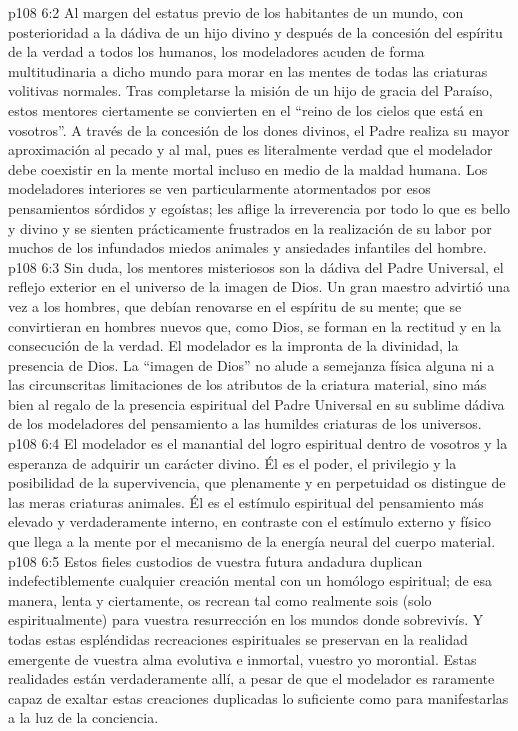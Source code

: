 \vs p108 6:2 Al margen del estatus previo de los habitantes de un mundo, con posterioridad a la dádiva de un hijo divino y después de la concesión del espíritu de la verdad a todos los humanos, los modeladores acuden de forma multitudinaria a dicho mundo para morar en las mentes de todas las criaturas volitivas normales. Tras completarse la misión de un hijo de gracia del Paraíso, estos mentores ciertamente se convierten en el “reino de los cielos que está en vosotros”. A través de la concesión de los dones divinos, el Padre realiza su mayor aproximación al pecado y al mal, pues es literalmente verdad que el modelador debe coexistir en la mente mortal incluso en medio de la maldad humana. Los modeladores interiores se ven particularmente atormentados por esos pensamientos sórdidos y egoístas; les aflige la irreverencia por todo lo que es bello y divino y se sienten prácticamente frustrados en la realización de su labor por muchos de los infundados miedos animales y ansiedades infantiles del hombre.
\vs p108 6:3 \pc Sin duda, los mentores misteriosos son la dádiva del Padre Universal, el reflejo exterior en el universo de la imagen de Dios. Un gran maestro advirtió una vez a los hombres, que debían renovarse en el espíritu de su mente; que se convirtieran en hombres nuevos que, como Dios, se forman en la rectitud y en la consecución de la verdad. El modelador es la impronta de la divinidad, la presencia de Dios. La “imagen de Dios” no alude a semejanza física alguna ni a las circunscritas limitaciones de los atributos de la criatura material, sino más bien al regalo de la presencia espiritual del Padre Universal en su sublime dádiva de los modeladores del pensamiento a las humildes criaturas de los universos.
\vs p108 6:4 El modelador es el manantial del logro espiritual dentro de vosotros y la esperanza de adquirir un carácter divino. Él es el poder, el privilegio y la posibilidad de la supervivencia, que plenamente y en perpetuidad os distingue de las meras criaturas animales. Él es el estímulo espiritual del pensamiento más elevado y verdaderamente interno, en contraste con el estímulo externo y físico que llega a la mente por el mecanismo de la energía neural del cuerpo material.
\vs p108 6:5 Estos fieles custodios de vuestra futura andadura duplican indefectiblemente cualquier creación mental con un homólogo espiritual; de esa manera, lenta y ciertamente, os recrean tal como realmente sois (solo espiritualmente) para vuestra resurrección en los mundos donde sobrevivís. Y todas estas espléndidas recreaciones espirituales se preservan en la realidad emergente de vuestra alma evolutiva e inmortal, vuestro yo morontial. Estas realidades están verdaderamente allí, a pesar de que el modelador es raramente capaz de exaltar estas creaciones duplicadas lo suficiente como para manifestarlas a la luz de la conciencia.
